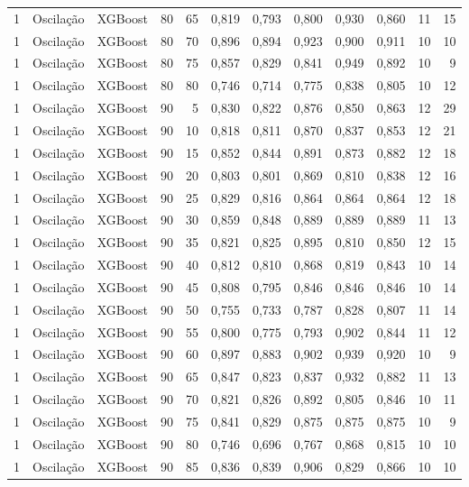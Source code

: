 \begin{longtable}{ccclrrrrrrrr}
1 & Oscilação & XGBoost & 80 & 65 & 0,819 & 0,793 & 0,800 & 0,930 & 0,860 & 11 & 15 \\
1 & Oscilação & XGBoost & 80 & 70 & 0,896 & 0,894 & 0,923 & 0,900 & 0,911 & 10 & 10 \\
1 & Oscilação & XGBoost & 80 & 75 & 0,857 & 0,829 & 0,841 & 0,949 & 0,892 & 10 & 9 \\
1 & Oscilação & XGBoost & 80 & 80 & 0,746 & 0,714 & 0,775 & 0,838 & 0,805 & 10 & 12 \\
1 & Oscilação & XGBoost & 90 & 5 & 0,830 & 0,822 & 0,876 & 0,850 & 0,863 & 12 & 29 \\
1 & Oscilação & XGBoost & 90 & 10 & 0,818 & 0,811 & 0,870 & 0,837 & 0,853 & 12 & 21 \\
1 & Oscilação & XGBoost & 90 & 15 & 0,852 & 0,844 & 0,891 & 0,873 & 0,882 & 12 & 18 \\
1 & Oscilação & XGBoost & 90 & 20 & 0,803 & 0,801 & 0,869 & 0,810 & 0,838 & 12 & 16 \\
1 & Oscilação & XGBoost & 90 & 25 & 0,829 & 0,816 & 0,864 & 0,864 & 0,864 & 12 & 18 \\
1 & Oscilação & XGBoost & 90 & 30 & 0,859 & 0,848 & 0,889 & 0,889 & 0,889 & 11 & 13 \\
1 & Oscilação & XGBoost & 90 & 35 & 0,821 & 0,825 & 0,895 & 0,810 & 0,850 & 12 & 15 \\
1 & Oscilação & XGBoost & 90 & 40 & 0,812 & 0,810 & 0,868 & 0,819 & 0,843 & 10 & 14 \\
1 & Oscilação & XGBoost & 90 & 45 & 0,808 & 0,795 & 0,846 & 0,846 & 0,846 & 10 & 14 \\
1 & Oscilação & XGBoost & 90 & 50 & 0,755 & 0,733 & 0,787 & 0,828 & 0,807 & 11 & 14 \\
1 & Oscilação & XGBoost & 90 & 55 & 0,800 & 0,775 & 0,793 & 0,902 & 0,844 & 11 & 12 \\
1 & Oscilação & XGBoost & 90 & 60 & 0,897 & 0,883 & 0,902 & 0,939 & 0,920 & 10 & 9 \\
1 & Oscilação & XGBoost & 90 & 65 & 0,847 & 0,823 & 0,837 & 0,932 & 0,882 & 11 & 13 \\
1 & Oscilação & XGBoost & 90 & 70 & 0,821 & 0,826 & 0,892 & 0,805 & 0,846 & 10 & 11 \\
1 & Oscilação & XGBoost & 90 & 75 & 0,841 & 0,829 & 0,875 & 0,875 & 0,875 & 10 & 9 \\
1 & Oscilação & XGBoost & 90 & 80 & 0,746 & 0,696 & 0,767 & 0,868 & 0,815 & 10 & 10 \\
1 & Oscilação & XGBoost & 90 & 85 & 0,836 & 0,839 & 0,906 & 0,829 & 0,866 & 10 & 10 \\

\end{longtable}
